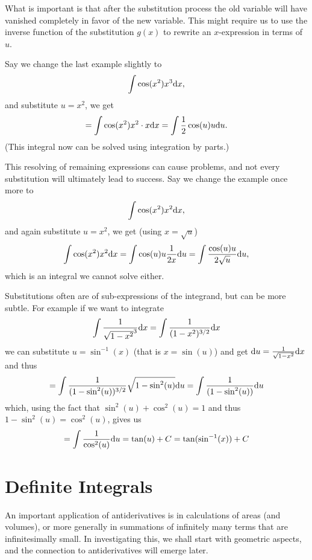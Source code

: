 What is important is that after the substitution process
the old variable will have vanished completely in favor of the new variable.
This might require us to use the inverse function of the substitution $g(x)$
to rewrite an $x$-expression in terms of $u$.

Say we change the last example slightly to
\[
\int\cos(x^2)x^3{\mbox{d}}x,
\]
and substitute $u=x^2$, we get
\[
=\int\cos(x^2) x^2\cdot x{\mbox{d}}x=\int\frac12 \cos(u)u{\mbox{d}}u.
\]
(This integral now can be solved using integration by parts.)

This resolving of remaining expressions can cause problems, and not every
substitution will ultimately lead to success. Say we change the example once
more to
\[
\int\cos(x^2)x^2{\mbox{d}}x,
\]
and again substitute $u=x^2$, we get (using $x=\sqrt{u}$)
\[
\int\cos(x^2) x^2 {\mbox{d}}x=\int\cos(u)u\frac{1}{2x}{\mbox{d}}u
=\int\frac{\cos(u)u}{2\sqrt{u}}{\mbox{d}}u,
\]
which is an integral we cannot solve either.
\smallskip

Substitutions often are of sub-expressions of the integrand, but can be more
subtle. For example if we want to integrate
\[
\int \frac{1}{\sqrt{1-x^2}^3}{\mbox{d}}x
=\int \frac{1}{(1-x^2)^{3/2}}{\mbox{d}}x
\]
we can substitute $u=\sin^{-1}(x)$ (that is
$x=\sin(u)$) and get ${\mbox{d}}u=\frac{1}{\sqrt{1-x^2}}{\mbox{d}}x$ and thus
\[
=\int \frac{1}{(1-\sin^2(u))^{3/2}}\sqrt{1-\sin^2(u)}{\mbox{d}}u
=\int \frac{1}{(1-\sin^2(u))}{\mbox{d}}u
\]
which, using the fact that $\sin^2(u)+\cos^2(u)=1$ and thus
$1-\sin^2(u)=\cos^2(u)$, gives us
\[
=\int \frac{1}{\cos^2(u)}{\mbox{d}}u=\tan(u)+C=\tan(\sin^{-1}(x))+C
\]


\section{Definite Integrals}
\label{RiemannIntegral}

An important application of antiderivatives is in calculations of areas (and
volumes), or more generally in summations of infinitely many terms that are
infinitesimally small.
In investigating this, we shall start with geometric aspects, and the
connection to antiderivatives will emerge later.
\smallskip

